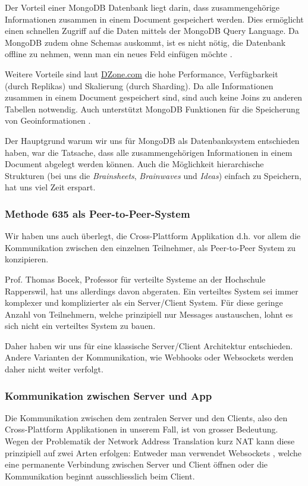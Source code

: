 Der Vorteil einer MongoDB Datenbank liegt darin, dass zusammengehörige Informationen zusammen in einem Document gespeichert werden. Dies ermöglicht einen schnellen Zugriff auf die Daten mittels der MongoDB Query Language. Da MongoDB zudem ohne Schemas auskommt, ist es nicht nötig, die Datenbank offline zu nehmen, wenn man ein neues Feld einfügen möchte \cite{MonogDB}.

Weitere Vorteile sind laut \href{DZone.com}{DZone.com} die hohe Performance, Verfügbarkeit (durch Replikas) und Skalierung (durch Sharding). Da alle Informationen zusammen in einem Document gespeichert sind, sind auch keine Joins zu anderen Tabellen notwendig. Auch unterstützt MongoDB Funktionen für die Speicherung von Geoinformationen \cite{MonogDBDZone}.

Der Hauptgrund warum wir uns für MongoDB als Datenbanksystem entschieden haben, war die Tatsache, dass alle zusammengehörigen Informationen in einem Document abgelegt werden können. Auch die Möglichkeit hierarchische Strukturen (bei uns die \textit{Brainsheets}, \textit{Brainwaves} und \textit{Ideas}) einfach zu Speichern, hat uns viel Zeit erspart.

\subsubsection{Methode 635 als Peer-to-Peer-System}
Wir haben uns auch überlegt, die Cross-Plattform Applikation d.h. vor allem die Kommunikation zwischen den einzelnen Teilnehmer, als Peer-to-Peer System \cite{Peer2Peer} zu konzipieren.


Prof. Thomas Bocek, Professor für verteilte Systeme an der Hochschule Rapperswil, hat uns allerdings davon abgeraten. Ein verteiltes System sei immer komplexer und komplizierter als ein Server/Client System. Für diese geringe Anzahl von Teilnehmern, welche prinzipiell nur Messages austauschen, lohnt es sich nicht ein verteiltes System zu bauen. 


Daher haben wir uns für eine klassische Server/Client Architektur entschieden. Andere Varianten der Kommunikation, wie Webhooks oder Websockets werden daher nicht weiter verfolgt.

\subsubsection{Kommunikation zwischen Server und App}
Die Kommunikation zwischen dem zentralen Server und den Clients, also den Cross-Plattform Applikationen in unserem Fall, ist von grosser Bedeutung. Wegen der Problematik der Network Address Translation kurz NAT \cite{NAT} kann diese prinzipiell auf zwei Arten erfolgen: Entweder man verwendet Websockets \cite{WebSockets}, welche eine permanente Verbindung zwischen Server und Client öffnen oder die Kommunikation beginnt ausschliesslich beim Client. 


